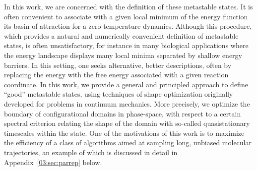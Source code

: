     In this work, we are concerned with the definition of these metastable states.
    It is often convenient to associate with a given local minimum of the energy function its basin of attraction for a zero-temperature dynamics. Although this procedure, which provides a natural and numerically convenient definition of metastable states, is often unsatisfactory, for instance in many biological applications where the energy landscape displays many local minima separated by shallow energy barriers.
    In this setting, one seeks alternative, better descriptions, often by replacing the energy with the free energy associated with a given reaction coordinate. In this work, we provide a general and principled approach to define ``good'' metastable states, using techniques of shape optimization originally developed for problems in continuum mechanics.
    More precisely, we optimize the boundary of configurational domains in phase-space, with respect to a certain spectral criterion relating the shape of the domain with so-called quasistationary timescales within the state.
    One of the motivations of this work is to maximize the efficiency of a class of algorithms aimed at sampling long, unbiased molecular trajectories, an example of which is discussed in detail in Appendix~\ref{03:sec:parrep} below.

